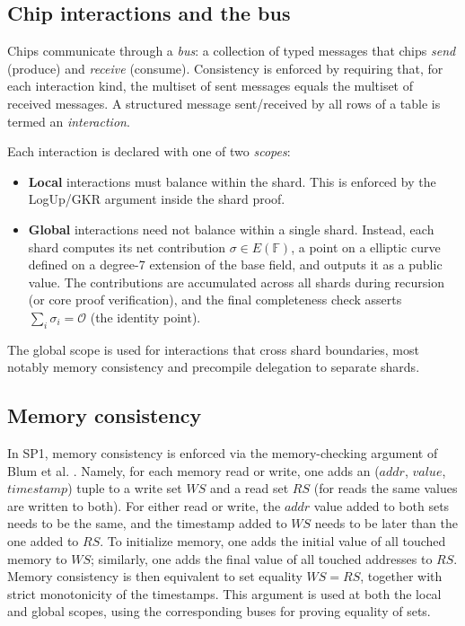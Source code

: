 \documentclass[11pt]{article}
\newcommand{\rnote}[1]{{\color{red} {Ron: #1}}}
\begin{document}
\subsection{Chip interactions and the bus}\label{sec:bus}

Chips communicate through a \emph{bus}: a collection of
typed messages that chips \emph{send} (produce) and \emph{receive}
(consume).
Consistency is enforced by requiring that, for each interaction kind,
the multiset of sent messages equals the multiset of received messages.
A structured message sent/received by all rows of a table is termed an \emph{interaction}.


Each interaction is declared with one of two \emph{scopes}:
\begin{itemize}
\item \textbf{Local} interactions must balance within the shard.
This is enforced by the LogUp/GKR argument inside the shard proof.
\item \textbf{Global} interactions need not balance within a single
shard.
Instead, each shard computes its net contribution
$\sigma\in E(\mathbb{F})$, a point on a
elliptic curve defined on a degree-7 extension of the base field,
and outputs it as a public value.
The contributions are accumulated across all shards during recursion (or core proof verification),
and the final completeness check asserts
$\sum_i \sigma_i = \mathcal{O}$ (the identity point).
\end{itemize}

The global scope is used for interactions that cross shard boundaries,
most notably memory consistency and precompile delegation to separate
shards.

\subsection{Memory consistency}\label{sec:memory}

In SP1, memory consistency is enforced via the memory-checking argument of Blum et al. \cite{Blum}.
Namely, for each memory read or write, one adds an ($addr$, $value$, $timestamp$) tuple to a write set $WS$
and a read set $RS$ (for reads the same values are written to both).
For either read or write, the $addr$ value added to both sets needs to be the same, and the timestamp
added to $WS$ needs to be later than the one added to $RS$.
To initialize memory, one adds the initial value of all touched memory to $WS$; similarly,
one adds the final value of all touched addresses to $RS$.
Memory consistency is then equivalent to set equality $WS=RS$, together with strict monotonicity of
the timestamps.
This argument is used at both the local and global scopes, using the corresponding buses for proving
equality of sets.
\end{document}
